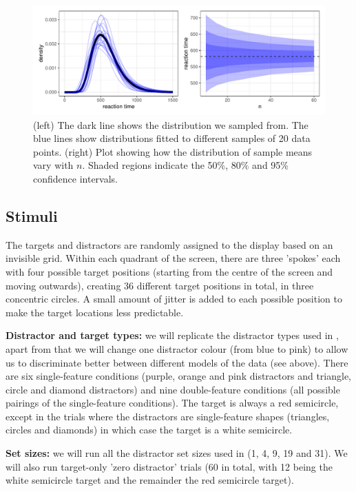 \documentclass[preprint,12pt,authoryear]{elsarticle}
\begin{document}
\begin{figure}
\centering
\includegraphics[width=\textwidth]{../plots/n_trials.pdf}
\caption{(left) The dark line shows the distribution we sampled from. The blue lines show distributions fitted to different samples of 20 data points. (right) Plot showing how the distribution of sample means vary with $n$. Shaded regions indicate the 50\%, 80\% and 95\% confidence intervals.}
\label{fig:n_trials}
\end{figure}

\subsection{Stimuli}
\label{sec:stimuli}

The targets and distractors are randomly assigned to the display based on an invisible grid. Within each quadrant of the screen, there are three 'spokes' each with four possible target positions (starting from the centre of the screen and moving outwards), creating 36 different target positions in total, in three concentric circles. A small amount of jitter is added to each possible position to make the target locations less predictable.

\textbf{Distractor and target types:} we will replicate the distractor types used in \cite{buetti2019predicting}, apart from that we will change one distractor colour (from blue to pink) to allow us to discriminate better between different models of the data (see above). There are six single-feature conditions (purple, orange and pink distractors and triangle, circle and diamond distractors) and nine double-feature conditions (all possible pairings of the single-feature conditions). The target is always a red semicircle, except in the trials where the distractors are single-feature shapes (triangles, circles and diamonds) in which case the target is a white semicircle.

\textbf{Set sizes:} we will run all the distractor set sizes used in \cite{buetti2019predicting} (1, 4, 9, 19 and 31). We will also run target-only 'zero distractor' trials (60 in total, with 12 being the white semicircle target and the remainder the red semicircle target).
\end{document}
